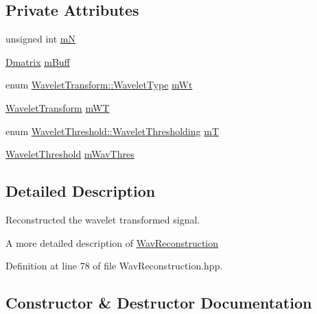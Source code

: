 \subsection*{Private Attributes}
\begin{DoxyCompactItemize}
\item 
unsigned int \hyperlink{classtsa_1_1_wav_reconstruction_a27b9eb7cb4914273f4551579aba645a6}{mN}
\item 
\hyperlink{namespacetsa_ad260cd21c1891c4ed391fe788569aba4}{Dmatrix} \hyperlink{classtsa_1_1_wav_reconstruction_a12d1f32ebdce8967bc9faacc7be2bad2}{m\+Buff}
\item 
enum \hyperlink{classtsa_1_1_wavelet_transform_a5a529de70e0004333fcf23b9cca88ce7}{Wavelet\+Transform\+::\+Wavelet\+Type} \hyperlink{classtsa_1_1_wav_reconstruction_ad97d775e3186bf6b642526359fa88580}{m\+Wt}
\item 
\hyperlink{classtsa_1_1_wavelet_transform}{Wavelet\+Transform} \hyperlink{classtsa_1_1_wav_reconstruction_a23f1a718111dd2028f82b954e85115b6}{m\+WT}
\item 
enum \hyperlink{classtsa_1_1_wavelet_threshold_a50c42c95dae960986a985157ca038fae}{Wavelet\+Threshold\+::\+Wavelet\+Thresholding} \hyperlink{classtsa_1_1_wav_reconstruction_a79826cf2c35973c054b45fa1e0e0a8f7}{mT}
\item 
\hyperlink{classtsa_1_1_wavelet_threshold}{Wavelet\+Threshold} \hyperlink{classtsa_1_1_wav_reconstruction_a487dbe8b4e390594631931f6bf7c60db}{m\+Wav\+Thres}
\end{DoxyCompactItemize}


\subsection{Detailed Description}
Reconstructed the wavelet transformed signal. 

A more detailed description of \hyperlink{classtsa_1_1_wav_reconstruction}{Wav\+Reconstruction} 

Definition at line 78 of file Wav\+Reconstruction.\+hpp.



\subsection{Constructor \& Destructor Documentation}
\mbox{\label{classtsa_1_1_wav_reconstruction_a30e49dd92bc216fdc8a8411914bac3da}} 
